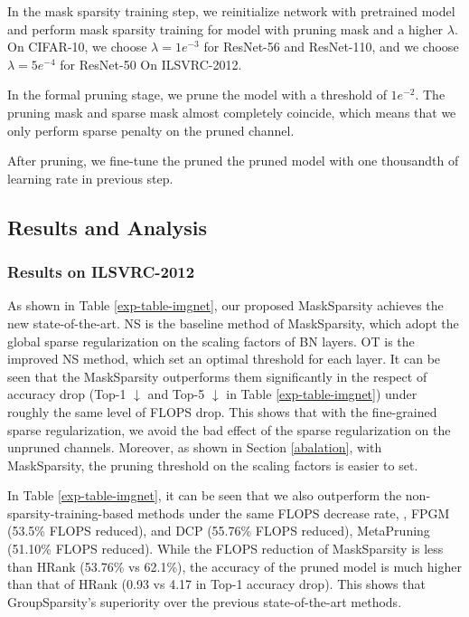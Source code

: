 \documentclass[review]{cvpr}
\begin{document}
In the mask sparsity training step, we reinitialize network with pretrained model and perform mask sparsity training for model with pruning mask and a higher $\lambda$. On CIFAR-10, we choose $\lambda=1e^{-3}$ for ResNet-56 and ResNet-110, and we choose $\lambda=5e^{-4}$ for ResNet-50 On ILSVRC-2012. 

In the formal pruning stage, we prune the model with a threshold of $1e^{-2}$. The pruning mask and sparse mask almost completely coincide,  which means that we only perform sparse penalty on the pruned channel.

After pruning, we fine-tune the pruned the pruned model with one thousandth of learning rate in previous step.



\subsection{Results and Analysis}

\subsubsection{Results on ILSVRC-2012}\label{results_on_ILSVRC-2012}
As shown in Table \ref{exp-table-imgnet}, our proposed MaskSparsity achieves the new state-of-the-art. NS \cite{liu2017learning} is the baseline method of MaskSparsity, which adopt the global sparse regularization on the scaling factors of BN layers. OT \cite{OT} is the improved NS method, which set an optimal threshold for each layer. It can be seen that the MaskSparsity outperforms them significantly in the respect of accuracy drop (Top-1 $\downarrow$  and Top-5 $\downarrow$  in Table \ref{exp-table-imgnet}) under roughly the same level of FLOPS drop. This shows that with the fine-grained sparse regularization, we avoid the bad effect of the sparse regularization on the unpruned channels. Moreover, as shown in Section \ref{abalation}, with MaskSparsity, the pruning threshold on the scaling factors is easier to set.

In Table \ref{exp-table-imgnet}, it can be seen that we also outperform the non-sparsity-training-based methods under the same FLOPS decrease rate, \eg, FPGM \cite{FPGM} (53.5\% FLOPS reduced), and DCP \cite{zhuang2018discrimination} (55.76\% FLOPS reduced), MetaPruning \cite{Metapruning} (51.10\% FLOPS reduced). While the FLOPS reduction of MaskSparsity is less than HRank (53.76\% vs 62.1\%), the accuracy of the pruned model is much higher than that of HRank (0.93 vs 4.17 in Top-1 accuracy drop).
This shows that GroupSparsity's superiority over the previous state-of-the-art methods.
 
\end{document}
